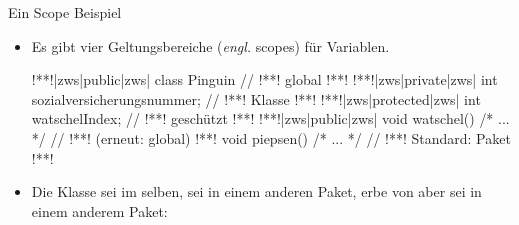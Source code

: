 {\begin{frame}[fragile,c]{Ein Scope Beispiel}
   \small\begin{itemize}[<+(1)->]
      \itemsep6pt
   \item Es gibt vier Geltungsbereiche (\textit{engl.} scopes) für Variablen.\vspace*{-8\baselineskip}
\begin{layout-imageonly}
\begin{plainjava}[language=xJava]
!**!|zws|public|zws| class Pinguin { // !**! global
!**!    !**!|zws|private|zws| int sozialversicherungsnummer; // !**! Klasse
!**!    !**!|zws|protected|zws| int watschelIndex; // !**! geschützt
!**!    !**!|zws|public|zws| void watschel() { /* ... */ } // !**! (erneut: global)
!**!    void piepsen() { /* ... */ } // !**! Standard: Paket
!**!}
\end{plainjava}\vspace*{-8.66\baselineskip}
\end{layout-imageonly}
\item<8-> Die Klasse  sei im selben,  sei in einem anderen Paket,  erbe von  aber sei in einem anderem Paket: \medskip\par
\hspace*{-5em}\hfill{}
\end{itemize}
\end{frame}

}
